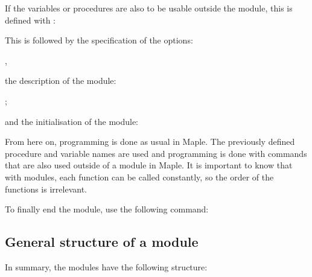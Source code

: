 \begin{alltt}
\end{alltt}
\medskip

If the variables or procedures are also to be usable outside the module, this is defined with :


\medskip


\medskip

This is followed by the specification of the options:

,

the description of the module:

;

and the initialisation of the module:


\begin{alltt}
\end{alltt} 

From here on, programming is done as usual in Maple. The previously defined procedure and variable names are used and programming is done with commands that are also used outside of a module in Maple. It is important to know that with modules, each function can be called constantly, so the order of the functions is irrelevant. 

\medskip

To finally end the module, use the following command:

\medskip


\subsection{General structure of a module}

In summary, the modules have the following structure:
 
